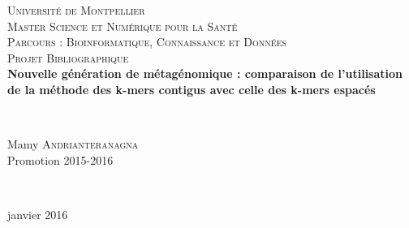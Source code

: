 \begin{titlepage}
  \begin{sffamily}
  \begin{center}


    \textsc{\LARGE Université de Montpellier}\\[2cm]

    \textsc{\Large Master Science et Numérique pour la Santé}\\[0.5cm]
		
		\textsc{\Large Parcours : Bioinformatique, Connaissance et Données}\\[3cm]
		
		\textsc{\Large Projet Bibliographique }\\[1.5cm]


    { \huge \bfseries Nouvelle génération de métagénomique : comparaison de l'utilisation de la méthode des k-mers contigus avec celle des k-mers espacés \\[0.1cm] }

    \HRule \\[3cm]


    \begin{minipage}{0.8\textwidth}
      \begin{centering} \large
        Mamy \textsc{Andrianteranagna}\\
        Promotion 2015-2016\\
      \end{centering}
    \end{minipage}\\[3cm]

    \vfill

    
    {\large janvier 2016}

  \end{center}
  \end{sffamily}
\end{titlepage}

